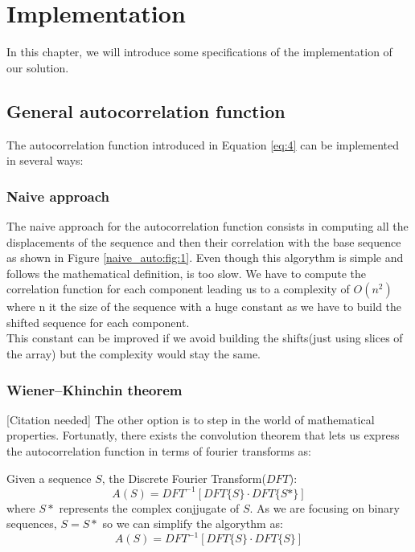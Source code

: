 \chapter{Implementation}
  In this chapter, we will introduce some specifications of the implementation
  of our solution.\\


  \section{General autocorrelation function}
    The autocorrelation function introduced in Equation \ref{eq:4} can be
    implemented in several ways:

      \subsection{Naive approach}
        The naive approach for the autocorrelation function consists in
        computing all the displacements of the sequence and then
        their correlation with the base sequence as shown in Figure
        \ref{naive_auto:fig:1}. Even though this algorythm is simple and follows
        the mathematical definition, is too slow. We have to compute the
        correlation function for each component leading us to a complexity of
        $O(n^{2})$ where n it the size of the sequence with a huge constant
        as we have to build the shifted sequence for each component.\\

        This constant can be improved if we avoid building the shifts(just
        using slices of the array) but the complexity would stay the same.

      \subsection{Wiener–Khinchin theorem}
        [Citation needed]
        The other option is to step in the world of mathematical properties.
        Fortunatly, there exists the convolution theorem that lets us express
        the autocorrelation function in terms of fourier transforms as:
        \begin{theorem}
          Given a sequence $S$, the Discrete Fourier Transform($DFT$):
          \begin{equation}
            A(S) = DFT^{-1}[DFT\{S\} · DFT\{S*\}]
          \end{equation}
          where $S*$ represents the complex conjjugate of $S$. As we are
          focusing on binary sequences, $S = S*$ so we can simplify the
          algorythm as:
          \begin{equation}
            A(S) = DFT^{-1}[DFT\{S\} · DFT\{S\}]
          \end{equation}
        \end{theorem}



